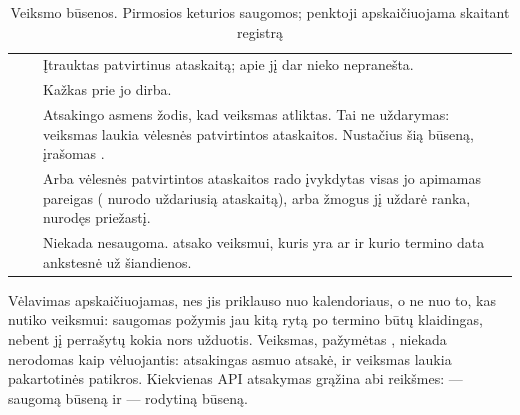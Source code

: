 \begin{table}[H]
\caption{Veiksmo būsenos. Pirmosios keturios saugomos; penktoji apskaičiuojama skaitant registrą}\label{tab:register:states}
\begin{tabularx}{\textwidth}{@{}L{22mm}L{45mm}Y@{}}
\toprule
{} &  &  \\
\midrule
{} &  & Įtrauktas patvirtinus ataskaitą; apie jį dar nieko nepranešta. \\
 &  & Kažkas prie jo dirba. \\
 &  &
  Atsakingo asmens žodis, kad veiksmas atliktas. Tai ne uždarymas: veiksmas laukia vėlesnės
  patvirtintos ataskaitos. Nustačius šią būseną, įrašomas . \\
 &  &
  Arba vėlesnės patvirtintos ataskaitos rado įvykdytas visas jo apimamas pareigas
  ( nurodo uždariusią ataskaitą), arba žmogus jį uždarė ranka, nurodęs
  priežastį. \\
\midrule
{} &  &
  Niekada nesaugoma.  atsako  veiksmui, kuris yra
   ar  ir kurio termino data ankstesnė už šiandienos. \\
\bottomrule
\end{tabularx}
\end{table}

Vėlavimas apskaičiuojamas, nes jis priklauso nuo kalendoriaus, o ne nuo to, kas nutiko
veiksmui: saugomas požymis jau kitą rytą po termino būtų klaidingas, nebent jį perrašytų kokia
nors užduotis. Veiksmas, pažymėtas , niekada nerodomas kaip vėluojantis: atsakingas
asmuo atsakė, ir veiksmas laukia pakartotinės patikros. Kiekvienas API atsakymas grąžina abi
reikšmes:  --- saugomą būseną ir  --- rodytiną būseną.

